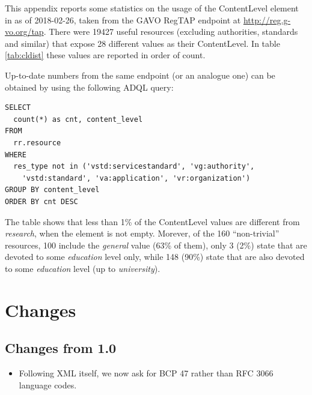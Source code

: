 \documentclass{ivoa}
\begin{document}
This appendix reports some statistics on the usage of the ContentLevel 
element in \citep{2008ivoa.spec.0222P} as of 2018-02-26, taken from the
GAVO RegTAP endpoint at \url{http://reg.g-vo.org/tap}.
There were 19427 useful resources (excluding authorities, standards and
similar) that expose 28 different values as their ContentLevel.
In table \ref{tab:cldist} these values are reported in order of count.

Up-to-date numbers from the same endpoint (or an analogue 
one) can be obtained by using the following ADQL query:

\begin{verbatim}
SELECT 
  count(*) as cnt, content_level
FROM 
  rr.resource
WHERE
  res_type not in ('vstd:servicestandard', 'vg:authority', 
    'vstd:standard', 'va:application', 'vr:organization')
GROUP BY content_level
ORDER BY cnt DESC
\end{verbatim}

The table shows that less than 1\% of the ContentLevel values 
are different from
\emph{research}, when 
the element is not empty. Morever, of the 160 ``non-trivial'' resources,
100 include the \emph{general} value (63\% of them), 
only 3 (2\%) state that are devoted to some 
\emph{education} level only,
while 148 (90\%) state that are also devoted to some 
\emph{education} level (up to 
\emph{university}).

\section{Changes}

\subsection{Changes from 1.0}

\begin{itemize}
\item Following XML itself, we now ask for BCP 47 rather than RFC
3066 language codes.
\end{itemize}


\end{document}
